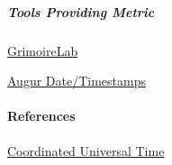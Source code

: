 \hypertarget{tools-providing-metric}{%
\subparagraph{Tools Providing Metric}\label{tools-providing-metric}}

\href{https://chaoss.github.io/grimoirelab/}{GrimoireLab}

\href{https://docs.augur.net/\#dates-timestamps}{Augur Date/Timestamps}

\hypertarget{references}{%
\paragraph{References}\label{references}}

\href{https://en.wikipedia.org/wiki/Coordinated_Universal_Time}{Coordinated
Universal Time}
